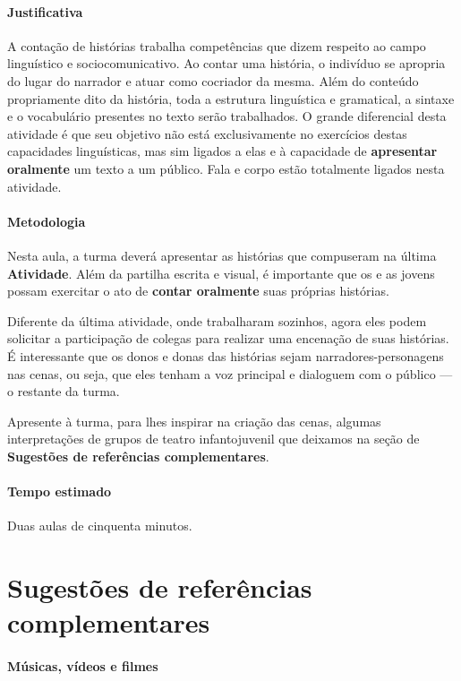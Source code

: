 \documentclass[11pt]{extarticle}
\begin{document}
\paragraph{Justificativa} A contação de histórias trabalha competências
que dizem respeito ao campo linguístico e sociocomunicativo. 
Ao contar uma história, o indivíduo se apropria do lugar do narrador e
atuar como cocriador da mesma. Além do conteúdo propriamente dito 
da história, toda a estrutura linguística e gramatical, a sintaxe 
e o vocabulário presentes no texto serão trabalhados. 
O grande diferencial desta atividade é que seu objetivo não está 
exclusivamente no exercícios destas capacidades linguísticas, 
mas sim ligados a elas e à capacidade de \textbf{apresentar oralmente}
um texto a um público. Fala e corpo estão totalmente ligados nesta atividade. 

\paragraph{Metodologia} Nesta aula, a turma deverá apresentar as histórias
que compuseram na última \textbf{Atividade}. Além da partilha escrita e visual,
é importante que os e as jovens possam exercitar o ato de \textbf{contar oralmente}
suas próprias histórias. 

Diferente da última atividade, onde trabalharam sozinhos, agora eles podem 
solicitar a participação de colegas para realizar uma encenação de suas histórias. 
É interessante que os donos e donas das histórias sejam narradores-personagens 
nas cenas, ou seja, que eles tenham a voz principal e dialoguem com o público --- o restante da turma. 

Apresente à turma, para lhes inspirar na criação das cenas, algumas interpretações
de grupos de teatro infantojuvenil que deixamos na seção de \textbf{Sugestões de referências complementares}.


\paragraph{Tempo estimado} Duas aulas de cinquenta minutos.


\section{Sugestões de referências complementares}

\paragraph{Músicas, vídeos e filmes}
\end{document}
